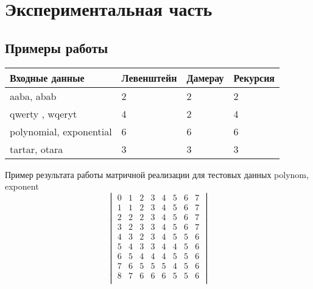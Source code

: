\documentclass[12pt]{article}
\begin{document}
\section{Экспериментальная часть}
\subsection{Примеры работы}
\begin{center}
	\begin{tabular}{| l | l | l | l |}
		\hline
		Входные данные & Левенштейн & Дамерау & Рекурсия \\ \hline
		aaba, abab & 2 & 2 & 2 \\ \hline
		qwerty , wqeryt & 4 & 2 & 4 \\ \hline
		polynomial, exponential & 6 & 6 & 6 \\ \hline
		tartar, otara & 3 & 3 & 3 \\ \hline
		\hline
	\end{tabular}
\newline
Пример результата работы матричной реализации для тестовых данных polynom, exponent
\newline
$$\begin{vmatrix} 
0 & 1 & 2 & 3 & 4 & 5 & 6 & 7 \\
1 & 1 & 2 & 3 & 4 & 5 & 6 & 7 \\ 
2 & 2 & 2 & 3 & 4 & 5 & 6 & 7 \\ 
3 & 2 & 3 & 3 & 4 & 5 & 6 & 7 \\ 
4 & 3 & 2 & 3 & 4 & 5 & 5 & 6 \\ 
5 & 4 & 3 & 3 & 4 & 4 & 5 & 6 \\ 
6 & 5 & 4 & 4 & 4 & 5 & 5 & 6 \\ 
7 & 6 & 5 & 5 & 5 & 4 & 5 & 6 \\ 
8 & 7 & 6 & 6 & 6 & 5 & 5 & 6 \\
\end{vmatrix}$$
\end{center}
\end{document}
